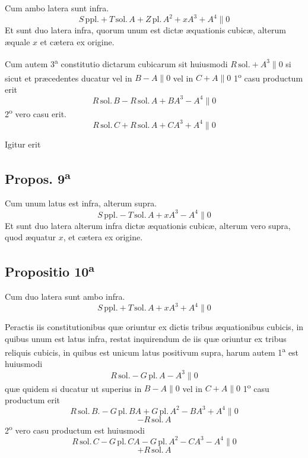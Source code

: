 \documentclass[11pt,a4paper]{article}
\begin{document}
Cum ambo latera sunt infra.
\[ S\,\mathrm{ppl.} + T\,\mathrm{sol.}\,A + Z\,\mathrm{pl.}\,A^2 + x A^3 + A^4 \parallel 0 \]
Et sunt duo latera infra, quorum unum est dictæ æquationis cubicæ, alterum æquale $x$ et cætera ex origine.

Cum autem 3\textsuperscript{a} constitutio dictarum cubicarum sit huiusmodi $R\,\mathrm{sol.} + A^3 \parallel 0$ si sicut et præcedentes ducatur vel in $B - A \parallel 0$ vel in $C + A \parallel 0$ 1\textsuperscript{o} casu productum erit
\[ R\,\mathrm{sol.}\,B - R\,\mathrm{sol.}\,A + B A^3 - A^4 \parallel 0 \]
2\textsuperscript{o} vero casu erit.
\[ R\,\mathrm{sol.}\,C + R\,\mathrm{sol.}\,A + C A^3 + A^4 \parallel 0 \]


Igitur erit

\subsection*{Propos. 9\textsuperscript{a}}

Cum unum latus est infra, alterum supra.
\[ S\,\mathrm{ppl.} - T\,\mathrm{sol.}\,A + x A^3 - A^4 \parallel 0 \]
Et sunt duo latera alterum infra dictæ æquationis cubicæ, alterum vero supra, quod æquatur $x$, et cætera ex origine.

\subsection*{Propositio 10\textsuperscript{a}}

Cum duo latera sunt ambo infra.
\[ S\,\mathrm{ppl.} + T\,\mathrm{sol.}\,A + x A^3 + A^4 \parallel 0 \]

Peractis iis constitutionibus quæ oriuntur ex dictis tribus æquationibus cubicis, in quibus unum est latus infra, restat inquirendum de iis quæ oriuntur ex tribus reliquis cubicis, in quibus est unicum latus positivum supra, harum autem 1\textsuperscript{a} est huiusmodi
\[ R\,\mathrm{sol.} - G\,\mathrm{pl.}\,A - A^3 \parallel 0 \]
quæ quidem si ducatur ut superius in $B - A \parallel 0$ vel in $C + A \parallel 0$ 1\textsuperscript{o} casu productum erit
\[ R\,\mathrm{sol.}\,B. - G\,\mathrm{pl.}\,B A + G\,\mathrm{pl.}\,A^2 - B A^3 + A^4 \parallel 0 \]
\[ - R\,\mathrm{sol.}\,A \]
2\textsuperscript{o} vero casu productum est huiusmodi
\[ R\,\mathrm{sol.}\,C - G\,\mathrm{pl.}\,C A - G\,\mathrm{pl.}\,A^2 - C A^3 - A^4 \parallel 0 \]
\[ + R\,\mathrm{sol.}\,A \]
\end{document}
